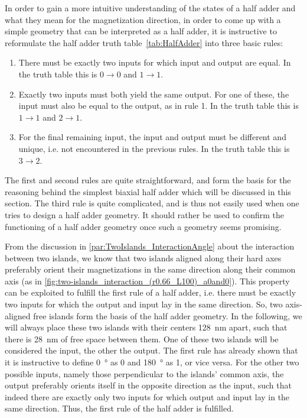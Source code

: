\documentclass[11pt,a4paper,english,twoside]{article}
\begin{document}
In order to gain a more intuitive understanding of the states of a half adder and what they mean for the magnetization direction, in order to come up with a simple geometry that can be interpreted as a half adder, it is instructive to reformulate the half adder truth table~\ref{tab:HalfAdder} into three basic rules:
\begin{enumerate}
    \item There must be exactly two inputs for which input and output are equal. In the truth table this is $0\rightarrow0$ and $1\rightarrow1$.
    \item Exactly two inputs must both yield the same output. For one of these, the input must also be equal to the output, as in rule 1. In the truth table this is $1\rightarrow1$ and $2\rightarrow1$.
    \item For the final remaining input, the input and output must be different and unique, i.e. not encountered in the previous rules. In the truth table this is $3\rightarrow2$.
\end{enumerate}
The first and second rules are quite straightforward, and form the basis for the reasoning behind the simplest biaxial half adder which will be discussed in this section. The third rule is quite complicated, and is thus not easily used when one tries to design a half adder geometry. It should rather be used to confirm the functioning of a half adder geometry once such a geometry seems promising. \par
From the discussion in \cref{par:TwoIslands_InteractionAngle} about the interaction between two islands, we know that two islands aligned along their hard axes preferably orient their magnetizations in the same direction along their common axis (as in \cref{fig:two-islands_interaction_(r0.66_L100)_a0and0}). This property can be exploited to fulfill the first rule of a half adder, i.e. there must be exactly two inputs for which the output and input lay in the same direction. So, two axis-aligned free islands form the basis of the half adder geometry. In the following, we will always place these two islands with their centers \SI{128}{\nano\metre} apart, such that there is \SI{28}{\nano\metre} of free space between them. One of these two islands will be considered the input, the other the output. The first rule has already shown that it is instructive to define \SI{0}{\degree} as 0 and \SI{180}{\degree} as 1, or vice versa. For the other two possible inputs, namely those perpendicular to the islands' common axis, the output preferably orients itself in the opposite direction as the input, such that indeed there are exactly only two inputs for which output and input lay in the same direction. Thus, the first rule of the half adder is fulfilled. \par
\end{document}
